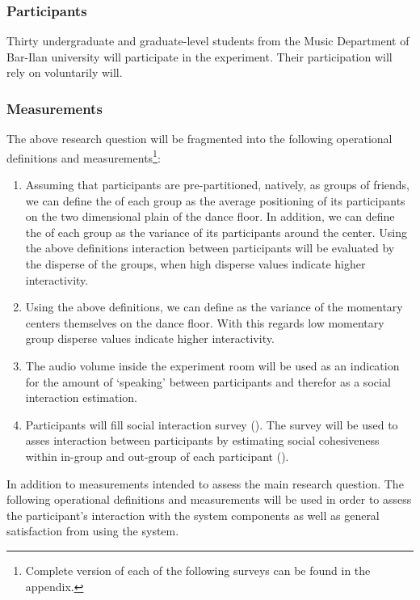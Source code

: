 \subsubsection{Participants}

Thirty undergraduate and graduate-level students from the Music Department of Bar-Ilan university will participate in the experiment. Their participation will rely on voluntarily will.

\subsubsection{Measurements}

The above research question will be fragmented into the following operational definitions and measurements\footnote{Complete version of each of the following surveys can be found in the appendix.}:
\begin{enumerate}
	\item \label{measure:disperse} Assuming that participants are pre-partitioned, natively, as groups of friends, we can define the  of each group as the average positioning of its participants on the two dimensional plain of the dance floor. In addition, we can define the  of each group as the variance of its participants around the center. Using the above definitions interaction between participants will be evaluated by the disperse of the groups, when high disperse values indicate higher interactivity.
	\item \label{measure:groups} Using the above definitions, we can define  as the variance of the momentary centers themselves on the dance floor. With this regards low momentary group disperse values indicate higher interactivity.
	\item \label{measure:audio} The audio volume inside the experiment room will be used as an indication for the amount of `speaking' between participants and therefor as a social interaction estimation.
	\item \label{measure:survey:social} Participants will fill social interaction survey (). The survey will be used to asses interaction between participants by estimating social cohesiveness within in-group and out-group of each participant ().
\end{enumerate}
In addition to measurements intended to assess the main research question. The following operational definitions and measurements will be used in order to assess the participant's interaction with the system components as well as general satisfaction from using the system.
